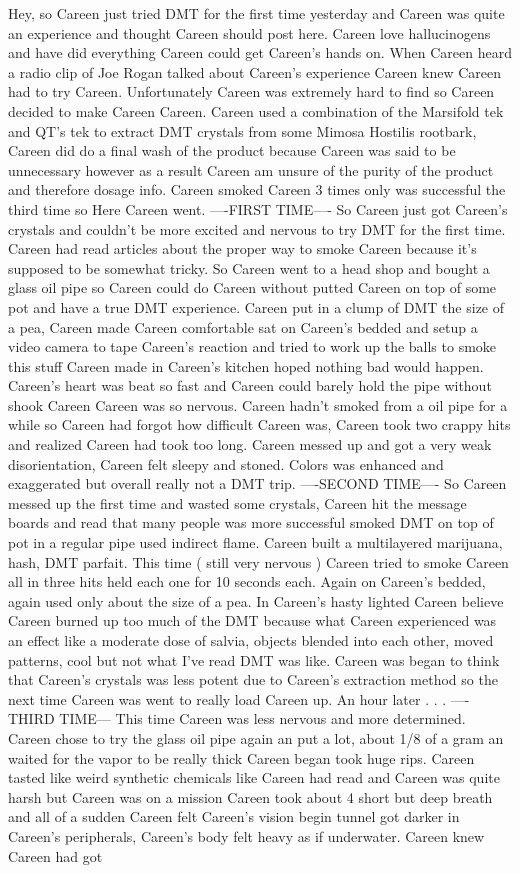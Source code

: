 \documentclass[12pt]{book}
\begin{document}
Hey, so Careen just tried DMT for the first time yesterday and Careen was quite an experience and thought Careen should post here. Careen love hallucinogens and have did everything Careen could get Careen's hands on. When Careen heard a radio clip of Joe Rogan talked about Careen's experience Careen knew Careen had to try Careen. Unfortunately Careen was extremely hard to find so Careen decided to make Careen Careen. Careen used a combination of the Marsifold tek and QT's tek to extract DMT crystals from some Mimosa Hostilis rootbark, Careen did do a final wash of the product because Careen was said to be unnecessary however as a result Careen am unsure of the purity of the product and therefore dosage info. Careen smoked Careen 3 times only was successful the third time so Here Careen went. ----FIRST TIME---- So Careen just got Careen's crystals and couldn't be more excited and nervous to try DMT for the first time. Careen had read articles about the proper way to smoke Careen because it's supposed to be somewhat tricky. So Careen went to a head shop and bought a glass oil pipe so Careen could do Careen without putted Careen on top of some pot and have a true DMT experience. Careen put in a clump of DMT the size of a pea, Careen made Careen comfortable sat on Careen's bedded and setup a video camera to tape Careen's reaction and tried to work up the balls to smoke this stuff Careen made in Careen's kitchen hoped nothing bad would happen. Careen's heart was beat so fast and Careen could barely hold the pipe without shook Careen Careen was so nervous. Careen hadn't smoked from a oil pipe for a while so Careen had forgot how difficult Careen was, Careen took two crappy hits and realized Careen had took too long. Careen messed up and got a very weak disorientation, Careen felt sleepy and stoned. Colors was enhanced and exaggerated but overall really not a DMT trip. ----SECOND TIME---- So Careen messed up the first time and wasted some crystals, Careen hit the message boards and read that many people was more successful smoked DMT on top of pot in a regular pipe used indirect flame. Careen built a multilayered marijuana, hash, DMT parfait. This time ( still very nervous ) Careen tried to smoke Careen all in three hits held each one for 10 seconds each. Again on Careen's bedded, again used only about the size of a pea. In Careen's hasty lighted Careen believe Careen burned up too much of the DMT because what Careen experienced was an effect like a moderate dose of salvia, objects blended into each other, moved patterns, cool but not what I've read DMT was like. Careen was began to think that Careen's crystals was less potent due to Careen's extraction method so the next time Careen was went to really load Careen up. An hour later . . .  ----THIRD TIME--- This time Careen was less nervous and more determined. Careen chose to try the glass oil pipe again an put a lot, about 1/8 of a gram an waited for the vapor to be really thick Careen began took huge rips. Careen tasted like weird synthetic chemicals like Careen had read and Careen was quite harsh but Careen was on a mission Careen took about 4 short but deep breath and all of a sudden Careen felt Careen's vision begin tunnel got darker in Careen's peripherals, Careen's body felt heavy as if underwater. Careen knew Careen had got 
\end{document}
